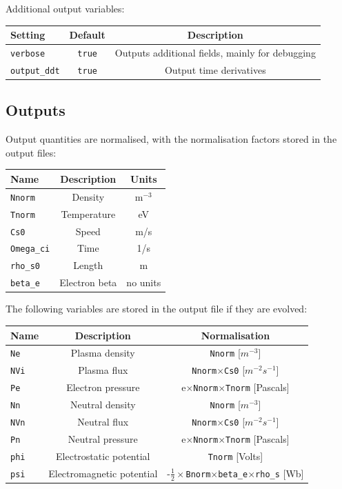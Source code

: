 \documentclass[12pt,a4paper]{article}
\begin{document}
Additional output variables:
\begin{center}
\begin{tabular}{l c c}
  Setting & Default & Description \\
  \hline
  \texttt{verbose} & \texttt{true} & Outputs additional fields, mainly for debugging\\
  \texttt{output\_ddt} & \texttt{true} & Output time derivatives \\
  \hline
\end{tabular}
\end{center}

\subsection{Outputs}
\label{sec:output}

Output quantities are normalised, with the normalisation factors stored in the output files:
\begin{center}
\begin{tabular}{l c c}
  Name & Description & Units \\
  \hline
  \texttt{Nnorm}  & Density  & m$^{-3}$\\
  \texttt{Tnorm}  & Temperature  & eV\\
  \texttt{Cs0}  & Speed  & m/s \\
  \texttt{Omega\_ci} & Time & 1/s \\
  \texttt{rho\_s0} & Length & m \\
  \texttt{beta\_e} & Electron beta & no units \\
  \hline
\end{tabular}
\end{center}

\noindent The following variables are stored in the output file if they are evolved:

\begin{center}
\begin{tabular}{l c c}
  Name & Description & Normalisation \\
  \hline
  \texttt{Ne}  & Plasma density  & \texttt{Nnorm} [$m^{-3}$]\\
  \texttt{NVi} & Plasma flux  & \texttt{Nnorm}$\times$\texttt{Cs0} [$m^{-2}s^{-1}$]\\
  \texttt{Pe}   & Electron pressure & e$\times$\texttt{Nnorm}$\times$\texttt{Tnorm} [Pascals] \\
  \texttt{Nn}  & Neutral density & \texttt{Nnorm} [$m^{-3}$] \\
  \texttt{NVn} & Neutral flux  & \texttt{Nnorm}$\times$\texttt{Cs0} [$m^{-2}s^{-1}$]\\
  \texttt{Pn}  & Neutral pressure & e$\times$\texttt{Nnorm}$\times$\texttt{Tnorm} [Pascals] \\
  \texttt{phi} & Electrostatic potential & \texttt{Tnorm} [Volts] \\
  \texttt{psi} & Electromagnetic potential & -$\frac{1}{2}\times$\texttt{Bnorm}$\times$\texttt{beta\_e}$\times$\texttt{rho\_s} [Wb] \\
  \hline
\end{tabular}
\end{center}
\end{document}
